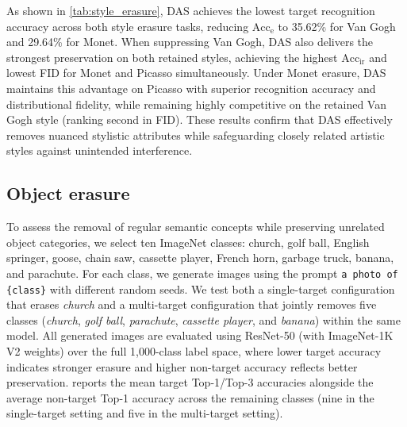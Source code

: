 As shown in \cref{tab:style_erasure}, DAS achieves the lowest target recognition accuracy across both style erasure tasks, reducing $\mathrm{Acc}_{\mathrm{e}}$ to 35.62\% for Van Gogh and 29.64\% for Monet. 
When suppressing Van Gogh, DAS also delivers the strongest preservation on both retained styles, achieving the highest $\mathrm{Acc}_{\mathrm{ir}}$ and lowest FID for Monet and Picasso simultaneously. 
Under Monet erasure, DAS maintains this advantage on Picasso with superior recognition accuracy and distributional fidelity, while remaining highly competitive on the retained Van Gogh style (ranking second in FID). 
These results confirm that DAS effectively removes nuanced stylistic attributes while safeguarding closely related artistic styles against unintended interference.

\subsection{Object erasure}
\label{sec:exp_object}

To assess the removal of regular semantic concepts while preserving unrelated object categories, we select ten ImageNet classes: church, golf ball, English springer, goose, chain saw, cassette player, French horn, garbage truck, banana, and parachute. 
For each class, we generate images using the prompt \texttt{a photo of \{class\}} with different random seeds.
We test both a single-target configuration that erases \textit{church} and a multi-target configuration that jointly removes five classes (\textit{church}, \textit{golf ball}, \textit{parachute}, \textit{cassette player}, and \textit{banana}) within the same model. 
All generated images are evaluated using ResNet-50 (with ImageNet-1K V2 weights) over the full 1,000-class label space, where lower target accuracy indicates stronger erasure and higher non-target accuracy reflects better preservation. 
 reports the mean target Top-1/Top-3 accuracies alongside the average non-target Top-1 accuracy across the remaining classes (nine in the single-target setting and five in the multi-target setting).

